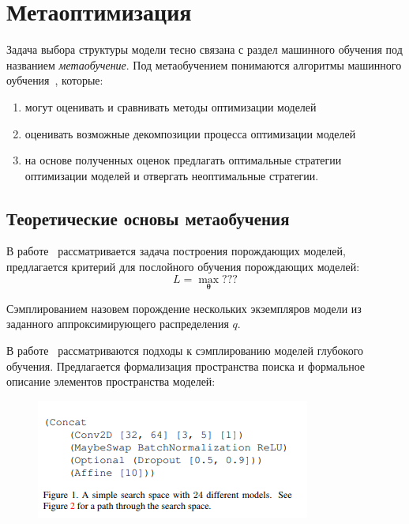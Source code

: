 \section{Метаоптимизация}
Задача выбора структуры модели тесно связана с раздел машинного обучения под названием \textit{метаобучение}. Под метаобучением понимаются алгоритмы машинного оубчения~\cite{metalearn}, которые:
\begin{enumerate}
\item могут оценивать и сравнивать методы оптимизации моделей
\item оценивать возможные декомпозиции процесса оптимизации моделей
\item на основе полученных оценок предлагать оптимальные стратегии оптимизации моделей и отвергать неоптимальные стратегии. 
\end{enumerate}



\subsection{Теоретические основы метаобучения }
В работе~\cite{layerwise_optimal} рассматривается задача построения порождающих моделей, предлагается критерий для послойного обучения порождающих моделей:
$$
L = \max_{\boldsymbol{\theta}} ???
$$

\begin{defin}
Сэмплированием назовем порождение нескольких экземпляров модели из заданного аппроксимирующего распределения $q$.
\end{defin}

В работе~\cite{search_space} рассматриваются подходы к сэмплированию моделей глубокого обучения. Предлагается формализация пространства поиска и формальное описание элементов  пространства моделей:
 \begin{figure}[H]
\includegraphics[width=\textwidth]{./plots/arch_review_figs/search_space.png}
\end{figure}

